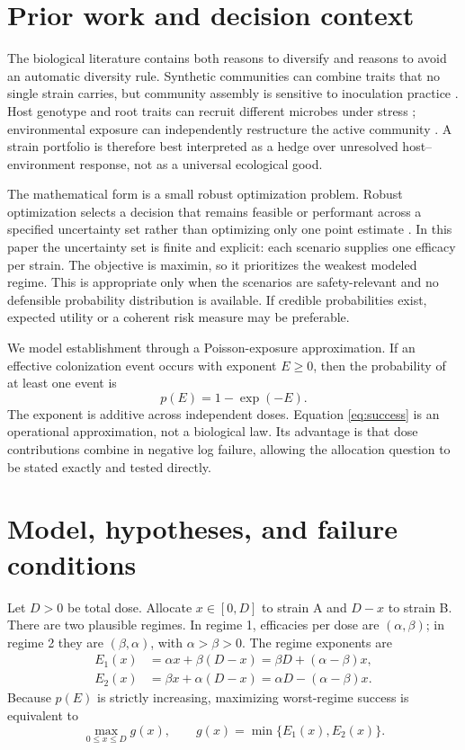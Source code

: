 \documentclass[10pt,twocolumn]{article}
\begin{document}
\section{Prior work and decision context}

The biological literature contains both reasons to diversify and reasons to
avoid an automatic diversity rule. Synthetic communities can combine traits
that no single strain carries, but community assembly is sensitive to
inoculation practice \cite{lin2024}. Host genotype and root traits can recruit
different microbes under stress \cite{wang2024}; environmental exposure can
independently restructure the active community \cite{bandopadhyay2024}. A
strain portfolio is therefore best interpreted as a hedge over unresolved
host--environment response, not as a universal ecological good.

The mathematical form is a small robust optimization problem. Robust
optimization selects a decision that remains feasible or performant across a
specified uncertainty set rather than optimizing only one point estimate
\cite{bental1998}. In this paper the uncertainty set is finite and explicit:
each scenario supplies one efficacy per strain. The objective is maximin, so it
prioritizes the weakest modeled regime. This is appropriate only when the
scenarios are safety-relevant and no defensible probability distribution is
available. If credible probabilities exist, expected utility or a coherent
risk measure may be preferable.

We model establishment through a Poisson-exposure approximation. If an
effective colonization event occurs with exponent $E\ge0$, then the probability
of at least one event is
\begin{equation}
 p(E)=1-\exp(-E).
 \label{eq:success}
\end{equation}
The exponent is additive across independent doses. Equation
\eqref{eq:success} is an operational approximation, not a biological law. Its
advantage is that dose contributions combine in negative log failure, allowing
the allocation question to be stated exactly and tested directly.

\section{Model, hypotheses, and failure conditions}

Let $D>0$ be total dose. Allocate $x\in[0,D]$ to strain A and $D-x$ to strain B.
There are two plausible regimes. In regime 1, efficacies per dose are
$(\alpha,\beta)$; in regime 2 they are $(\beta,\alpha)$, with
$\alpha>\beta>0$. The regime exponents are
\begin{align}
 E_1(x)&=\alpha x+\beta(D-x)
       =\beta D+(\alpha-\beta)x,\\
 E_2(x)&=\beta x+\alpha(D-x)
       =\alpha D-(\alpha-\beta)x.
\end{align}
Because $p(E)$ is strictly increasing, maximizing worst-regime success is
equivalent to
\begin{equation}
 \max_{0\le x\le D} g(x),\qquad
 g(x)=\min\{E_1(x),E_2(x)\}.
 \label{eq:maximin}
\end{equation}
\end{document}
